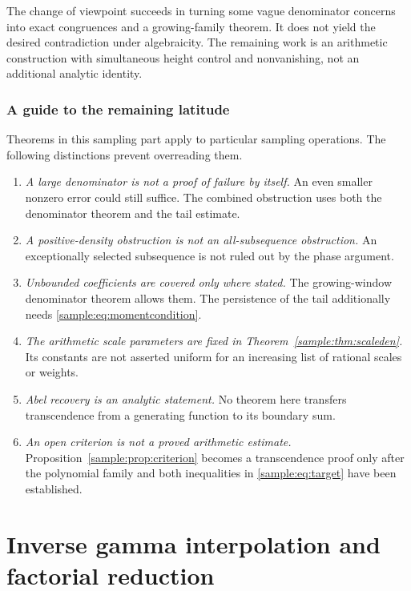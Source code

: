 \documentclass[11pt,a4paper]{article}
\theoremstyle{definition}
\theoremstyle{remark}
\numberwithin{equation}{section}
\begin{document}
The change of viewpoint succeeds in turning some vague denominator
concerns into exact congruences and a growing-family theorem. It does
not yield the desired contradiction under algebraicity. The remaining
work is an arithmetic construction with simultaneous height control and
nonvanishing, not an additional analytic identity.

\section{A guide to the remaining latitude}
Theorems in this sampling part apply to particular sampling operations. The
following distinctions prevent overreading them.
\begin{enumerate}
\item \emph{A large denominator is not a proof of failure by itself.}
An even smaller nonzero error could still suffice. The combined
obstruction uses both the denominator theorem and the tail estimate.
\item \emph{A positive-density obstruction is not an all-subsequence
obstruction.} An exceptionally selected subsequence is not ruled out by
the phase argument.
\item \emph{Unbounded coefficients are covered only where stated.}
The growing-window denominator theorem allows them. The persistence of
the tail additionally needs \eqref{sample:eq:momentcondition}.
\item \emph{The arithmetic scale parameters are fixed in
Theorem~\ref{sample:thm:scaleden}.} Its constants are not asserted uniform for
an increasing list of rational scales or weights.
\item \emph{Abel recovery is an analytic statement.} No theorem here
transfers transcendence from a generating function to its boundary sum.
\item \emph{An open criterion is not a proved arithmetic estimate.}
Proposition~\ref{sample:prop:criterion} becomes a transcendence proof only after
the polynomial family and both inequalities in \eqref{sample:eq:target} have
been established.
\end{enumerate}



\clearpage
\part{Inverse gamma interpolation and factorial reduction}\label{part:interpolation}
\end{document}
